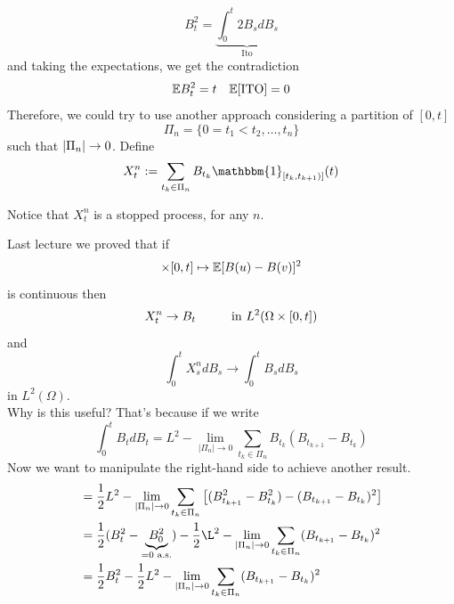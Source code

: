 \begin{equation*}
    B_t^2 = \underbrace{\int ^t_0 2 B_s dB_s }_{\text{Ito}}
\end{equation*}
and taking the expectations, we get the contradiction
\begin{equation*}
    \mathbb{E} B^2_t = t \quad \mathbb{E}[\text{ITO}] = 0
\end{equation*}
Therefore, we could try to use another approach considering a partition of $[0,t]$ 
\begin{equation*}
    \Pi_n=\{0 =t_1 < t_2, \dots, t_n\}
\end{equation*} 
such that $|\Pi_n|\rightarrow 0$. Define
\begin{equation*}
    X_t^n:= \sum_{t_k \in \Pi_n} B_{t_k} \mathbbm{1}_{[t_k, t_{k+1})]}(t)
\end{equation*}
\begin{remark}
    Notice that $X^n_t$ is a stopped process, for any $n$.
\end{remark}
Last lecture we proved that if 
\begin{equation*}
    [0,t]\times [0,t]\mapsto \mE [B(u)-B(v)]^2
\end{equation*}
is continuous then 
\begin{equation*}
    X_t^n \rightarrow B_t \hspace{1 cm} \text{in }L^2(\Omega \times [0,t])
\end{equation*}
and 
\begin{equation*}
    \int_0^t X_s^n dB_s \rightarrow \int_0^t B_s dB_s 
\end{equation*}
in $L^2(\Omega)$. \\
Why is this useful? That's because if we write
\begin{equation*}
    \int_0^t B_t dB_t = L^2- \lim_{|\Pi_n| \rightarrow 0} \sum_{t_k \in \Pi_n} B_{t_k} (B_{t_{k+1}} - B_{t_k})
\end{equation*}
Now we want to manipulate the right-hand side to achieve another result. 
\begin{align*}
    &= \frac{1}{2}L^2-\lim_{|\Pi_n|\ra 0}\sum_{t_k \in \Pi_n}\big[(B_{t_{k+1}}^2-B_{t_{k}}^2)-(B_{t_{k+1}}-B_{t_{k}})^2\big ] \\
    &= \frac{1}{2} (B^2_t - \underbrace{B_0^2}_{= 0 \text{  a.s.}}) - \frac{1}{2} \L^2-\lim_{|\Pi_n|\ra 0} \sum_{t_k \in \Pi_n} (B_{t_{k+1}} - B_{t_k})^2\\
    &= \frac{1}{2}B_t^2 -\frac{1}{2} L^2-\lim_{|\Pi_n|\ra 0}\sum_{t_k \in \Pi_n}(B_{t_{k+1}}-B_{t_{k}})^2
\end{align*}
